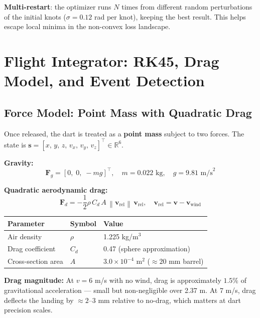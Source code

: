 \documentclass[11pt,letterpaper]{article}
\newcommand{\norm}[1]{\left\lVert#1\right\rVert}
\begin{document}
\textbf{Multi-restart}: the optimizer runs $N$ times from different random perturbations of the initial knots ($\sigma = 0.12$ rad per knot), keeping the best result. This helps escape local minima in the non-convex loss landscape.

\section{Flight Integrator: RK45, Drag Model, and Event Detection}

\subsection{Force Model: Point Mass with Quadratic Drag}

Once released, the dart is treated as a \textbf{point mass} subject to two forces. The state is $\bm{s} = [x,\, y,\, z,\, v_x,\, v_y,\, v_z]^\top \in \mathbb{R}^6$.

\textbf{Gravity:}
\begin{equation}
  \bm{F}_g = [0,\; 0,\; -mg]^\top, \quad m = 0.022\text{ kg},\quad g = 9.81\text{ m/s}^2
\end{equation}

\textbf{Quadratic aerodynamic drag:}
\begin{equation}
  \bm{F}_d = -\frac{1}{2}\rho\, C_d\, A\, \norm{\bm{v}_{\text{rel}}}\,\bm{v}_{\text{rel}},
  \quad \bm{v}_{\text{rel}} = \bm{v} - \bm{v}_{\text{wind}}
  \label{eq:drag}
\end{equation}

\begin{center}
\begin{tabular}{lll}
\toprule
Parameter & Symbol & Value \\
\midrule
Air density & $\rho$ & 1.225 kg/m$^3$ \\
Drag coefficient & $C_d$ & 0.47 (sphere approximation) \\
Cross-section area & $A$ & $3.0 \times 10^{-4}$ m$^2$ ($\approx20$ mm barrel) \\
\bottomrule
\end{tabular}
\end{center}

\begin{warnbox}
  \textbf{Drag magnitude:} At $v = 6$ m/s with no wind, drag is approximately $1.5\%$ of gravitational acceleration — small but non-negligible over 2.37 m. At 7 m/s, drag deflects the landing by $\approx2$--$3$ mm relative to no-drag, which matters at dart precision scales.
\end{warnbox}
\end{document}
